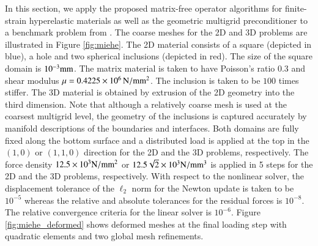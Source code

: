 \documentclass[times,doublespace]{nmeauth}
\begin{document}
In this section, we apply the proposed matrix-free operator algorithms for finite-strain hyperelastic materials as well as the geometric multigrid preconditioner to a benchmark problem from \cite{Miehe2007}. The coarse meshes for the 2D and 3D problems are illustrated in Figure \ref{fig:miehe}. The 2D material consists of a square (depicted in blue), a hole and two spherical inclusions (depicted in red). The size of the square domain is $10^{-3} \rm{mm}$.
The matrix material is taken to have Poisson's ratio $0.3$ and shear modulus $\mu=0.4225 \times 10^6\, \rm{N/mm^2}$. The inclusion is taken to be $100$ times stiffer.
The 3D material is obtained by extrusion of the 2D geometry into the third dimension.
Note that although a relatively coarse mesh is used at the coarsest multigrid level, the geometry of the inclusions is captured accurately by manifold descriptions of the boundaries and interfaces.
Both domains are fully fixed along the bottom surface and a distributed load is applied at the top in the $(1,0)$ or $(1,1,0)$ direction for the 2D and the 3D problems, respectively.
The force density $12.5 \times 10^3 \rm{N/mm^2}$ or $12.5 \sqrt{2} \times 10^3 \rm{N/mm^3}$ is applied in 5 steps for the 2D and the 3D problems, respectively.
With respect to the nonlinear solver, the displacement tolerance of the $\mathcal{\ell}_2$ norm for the Newton update is taken to be $10^{-5}$ whereas the relative and absolute tolerances for the residual forces is $10^{-8}$. The relative convergence criteria for the linear solver is $10^{-6}$.
%
Figure \ref{fig:miehe_deformed} shows deformed meshes at the final loading step with quadratic elements and two global mesh refinements.
%
\end{document}
